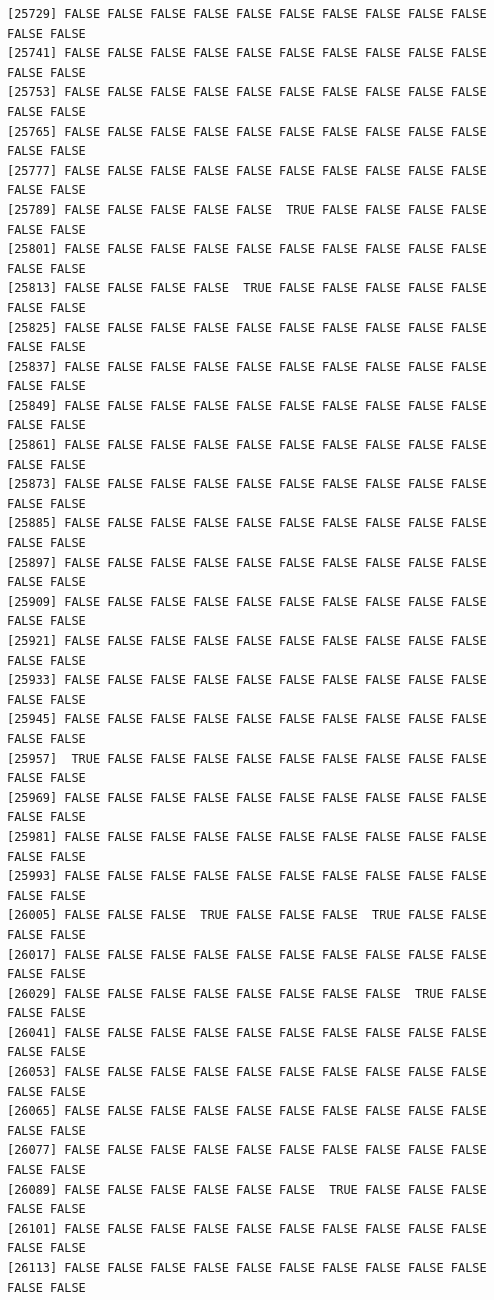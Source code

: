 \documentclass[
  a4paper,
  DIV=11,
  numbers=noendperiod]{scrartcl}
\begin{document}
\begin{verbatim}
[25729] FALSE FALSE FALSE FALSE FALSE FALSE FALSE FALSE FALSE FALSE FALSE FALSE
[25741] FALSE FALSE FALSE FALSE FALSE FALSE FALSE FALSE FALSE FALSE FALSE FALSE
[25753] FALSE FALSE FALSE FALSE FALSE FALSE FALSE FALSE FALSE FALSE FALSE FALSE
[25765] FALSE FALSE FALSE FALSE FALSE FALSE FALSE FALSE FALSE FALSE FALSE FALSE
[25777] FALSE FALSE FALSE FALSE FALSE FALSE FALSE FALSE FALSE FALSE FALSE FALSE
[25789] FALSE FALSE FALSE FALSE FALSE  TRUE FALSE FALSE FALSE FALSE FALSE FALSE
[25801] FALSE FALSE FALSE FALSE FALSE FALSE FALSE FALSE FALSE FALSE FALSE FALSE
[25813] FALSE FALSE FALSE FALSE  TRUE FALSE FALSE FALSE FALSE FALSE FALSE FALSE
[25825] FALSE FALSE FALSE FALSE FALSE FALSE FALSE FALSE FALSE FALSE FALSE FALSE
[25837] FALSE FALSE FALSE FALSE FALSE FALSE FALSE FALSE FALSE FALSE FALSE FALSE
[25849] FALSE FALSE FALSE FALSE FALSE FALSE FALSE FALSE FALSE FALSE FALSE FALSE
[25861] FALSE FALSE FALSE FALSE FALSE FALSE FALSE FALSE FALSE FALSE FALSE FALSE
[25873] FALSE FALSE FALSE FALSE FALSE FALSE FALSE FALSE FALSE FALSE FALSE FALSE
[25885] FALSE FALSE FALSE FALSE FALSE FALSE FALSE FALSE FALSE FALSE FALSE FALSE
[25897] FALSE FALSE FALSE FALSE FALSE FALSE FALSE FALSE FALSE FALSE FALSE FALSE
[25909] FALSE FALSE FALSE FALSE FALSE FALSE FALSE FALSE FALSE FALSE FALSE FALSE
[25921] FALSE FALSE FALSE FALSE FALSE FALSE FALSE FALSE FALSE FALSE FALSE FALSE
[25933] FALSE FALSE FALSE FALSE FALSE FALSE FALSE FALSE FALSE FALSE FALSE FALSE
[25945] FALSE FALSE FALSE FALSE FALSE FALSE FALSE FALSE FALSE FALSE FALSE FALSE
[25957]  TRUE FALSE FALSE FALSE FALSE FALSE FALSE FALSE FALSE FALSE FALSE FALSE
[25969] FALSE FALSE FALSE FALSE FALSE FALSE FALSE FALSE FALSE FALSE FALSE FALSE
[25981] FALSE FALSE FALSE FALSE FALSE FALSE FALSE FALSE FALSE FALSE FALSE FALSE
[25993] FALSE FALSE FALSE FALSE FALSE FALSE FALSE FALSE FALSE FALSE FALSE FALSE
[26005] FALSE FALSE FALSE  TRUE FALSE FALSE FALSE  TRUE FALSE FALSE FALSE FALSE
[26017] FALSE FALSE FALSE FALSE FALSE FALSE FALSE FALSE FALSE FALSE FALSE FALSE
[26029] FALSE FALSE FALSE FALSE FALSE FALSE FALSE FALSE  TRUE FALSE FALSE FALSE
[26041] FALSE FALSE FALSE FALSE FALSE FALSE FALSE FALSE FALSE FALSE FALSE FALSE
[26053] FALSE FALSE FALSE FALSE FALSE FALSE FALSE FALSE FALSE FALSE FALSE FALSE
[26065] FALSE FALSE FALSE FALSE FALSE FALSE FALSE FALSE FALSE FALSE FALSE FALSE
[26077] FALSE FALSE FALSE FALSE FALSE FALSE FALSE FALSE FALSE FALSE FALSE FALSE
[26089] FALSE FALSE FALSE FALSE FALSE FALSE  TRUE FALSE FALSE FALSE FALSE FALSE
[26101] FALSE FALSE FALSE FALSE FALSE FALSE FALSE FALSE FALSE FALSE FALSE FALSE
[26113] FALSE FALSE FALSE FALSE FALSE FALSE FALSE FALSE FALSE FALSE FALSE FALSE

\end{verbatim}
\end{document}

